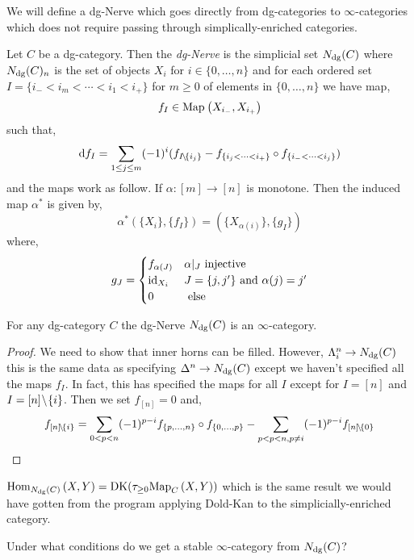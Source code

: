 \documentclass[12pt]{article}
\begin{document}
We will define a dg-Nerve which goes directly from dg-categories to $\infty$-categories which does not require passing through simplically-enriched categories.

\begin{defn}
Let $C$ be a dg-category. Then the \textit{dg-Nerve} is the simplicial set $N_{\mathrm{dg}}(C)$ where $N_{\mathrm{dg}}(C)_n$ is the set of objects $X_i$ for $i \in \{ 0, \dots, n \}$ and for each ordered set $I = \{ i_- < i_m < \cdots < i_1 < i_+ \}$ for $m \ge 0$ of elements in $\{ 0, \dots, n \}$ we have map,
\[ f_I \in \mathrm{Map}_{}\left(X_{i_-}, X_{i_+}\right) \]
such that,
\[ \mathrm{d}{f_I} = \sum_{1 \le j \le m} (-1)^i (f_{I \! \setminus \! \{ i_j \}} - f_{\{i_j < \cdots < i_+ \}} \circ f_{\{ i_- < \cdots < i_j \}}) \]
and the maps work as follow. If $\alpha : [m] \to [n]$ is monotone. Then the induced map $\alpha^*$ is given by,
\[ \alpha^* (\{ X_i \}, \{ f_I \}) = (\{ X_{\alpha(i)} \}, \{ g_I \}) \]
where,
\[ 
g_J = 
\begin{cases}
f_{\alpha(J)} & \alpha|_J \text{ injective} 
\\
\mathrm{id}_{X_i} & J = \{ j, j'\} \text{ and } \alpha(j) = j'
\\
0 & \text{ else}
\end{cases} \]
\end{defn}

\begin{prop}
For any dg-category $C$ the dg-Nerve $N_{\mathrm{dg}}(C)$ is an $\infty$-category. 
\end{prop}

\begin{proof}
We need to show that inner horns can be filled. However, $\Lambda^n_i \to N_{\mathrm{dg}}(C)$ this is the same data as specifying $\Delta^n \to N_{\mathrm{dg}}(C)$ except we haven't specified all the maps $f_I$. In fact, this has specified the maps for all $I$ except for $I = [n]$ and $I = [n] \! \setminus \! \{ i \}$. Then we set $f_{[n]} = 0$ and,
\[ f_{[n] \! \setminus \! \{ i \}} = \sum_{0 < p < n} (-1)^{p-i} f_{\{ p, \dots, n \}} \circ f_{\{0, \dots, p\}} - \sum_{p < p < n, p \neq i} (-1)^{p-i} f_{[n] \! \setminus \! \{ 0 \}} \]
\end{proof}

\begin{rmk}
$\mathrm{Hom}_{N_{\mathrm{dg}}(C)} \left( X, Y \right) = \mathrm{DK}(\tau_{\ge 0} \mathrm{Map}_{C}\left(X, Y\right))$ which is the same result we would have gotten from the program applying Dold-Kan to the simplicially-enriched category.
\end{rmk}

\begin{rmk}
Under what conditions do we get a stable $\infty$-category from $N_{\mathrm{dg}}(C)$?
\end{rmk}
\end{document}
